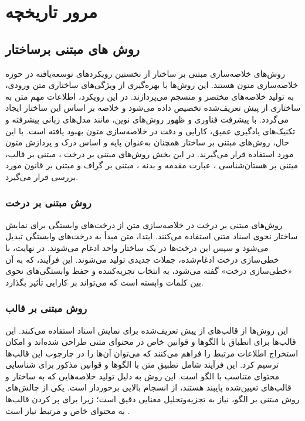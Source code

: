 \chapter{مرور تاریخچه}

\section{روش های مبتنی برساختار}
روش‌های خلاصه‌سازی مبتنی بر ساختار از نخستین رویکردهای توسعه‌یافته در حوزه خلاصه‌سازی متون هستند. این روش‌ها با بهره‌گیری از ویژگی‌های ساختاری متن ورودی، به تولید خلاصه‌های مختصر و منسجم می‌پردازند. در این رویکرد، اطلاعات مهم متن به ساختاری از پیش تعریف‌شده تخصیص داده می‌شود و خلاصه بر اساس این ساختار ایجاد می‌گردد. با پیشرفت فناوری و ظهور روش‌های نوین، مانند مدل‌های زبانی پیشرفته و تکنیک‌های یادگیری عمیق، کارایی و دقت در خلاصه‌سازی متون بهبود یافته است. با این حال، روش‌های مبتنی بر ساختار همچنان به‌عنوان پایه و اساس درک و پردازش متون مورد استفاده قرار می‌گیرند. در این بخش روش‌های مبتنی بر درخت 
، مبتنی بر قالب،
مبتنی بر هستان‌شناسی
، عبارت مقدمه و بدنه
، مبتنی بر گراف
و مبتنی بر قانون
مورد بررسی قرار می‌گیرد. 

\subsection{روش مبتنی بر درخت}
روش‌های مبتنی بر درخت در خلاصه‌سازی متن از درخت‌های وابستگی برای نمایش ساختار نحوی اسناد متنی استفاده می‌کنند. ابتدا، متن مبدأ به درخت‌های وابستگی تبدیل می‌شود و سپس این درخت‌ها در یک ساختار واحد ادغام می‌شوند. در نهایت، با خطی‌سازی درخت ادغام‌شده، جملات جدیدی تولید می‌شوند. این فرآیند، که به آن «خطی‌سازی درخت» گفته می‌شود، به انتخاب تجزیه‌کننده و حفظ وابستگی‌های نحوی بین کلمات وابسته است که می‌تواند بر کارایی تأثیر بگذارد\cite{andhale2016overview}.
\subsection{روش مبتنی بر قالب}
این روش‌ها از قالب‌های از پیش تعریف‌شده برای نمایش اسناد استفاده می‌کنند. این قالب‌ها برای انطباق با الگوها و قوانین خاص در محتوای متنی طراحی شده‌اند و امکان استخراج اطلاعات مرتبط را فراهم می‌کنند که می‌توان آن‌ها را در چارچوب این قالب‌ها ترسیم کرد. این فرآیند شامل تطبیق متن با الگوها و قوانین مذکور برای شناسایی محتوای متناسب با الگو است. این روش به دلیل تولید خلاصه‌هایی که به ساختار و قالب‌های تعیین‌شده پایبند هستند، از انسجام بالایی برخوردار است. یکی از چالش‌های روش مبتنی بر الگو، نیاز به تجزیه‌وتحلیل معنایی دقیق است؛ زیرا برای پر کردن قالب‌ها به محتوای خاص و مرتبط نیاز است
\cite{andhale2016overview}.
